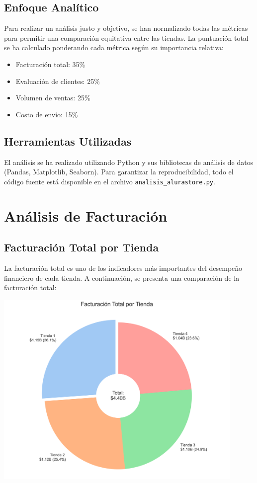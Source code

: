 \documentclass[12pt,a4paper]{report}\usepackage[spanish]{babel}\usepackage[utf8]{inputenc}\usepackage{graphicx}\usepackage{geometry}\usepackage{xcolor}\usepackage{tikz}\usepackage{pgfplots}\usepackage{booktabs}\usepackage{multicol}\usepackage{hyperref}\usepackage{pgf-pie}
\begin{document}
\section{Enfoque Analítico}
Para realizar un análisis justo y objetivo, se han normalizado todas las métricas para permitir una comparación equitativa entre las tiendas. La puntuación total se ha calculado ponderando cada métrica según su importancia relativa:

\begin{itemize}
    \item Facturación total: 35\%
    \item Evaluación de clientes: 25\%
    \item Volumen de ventas: 25\%
    \item Costo de envío: 15\%
\end{itemize}

\section{Herramientas Utilizadas}
El análisis se ha realizado utilizando Python y sus bibliotecas de análisis de datos (Pandas, Matplotlib, Seaborn). Para garantizar la reproducibilidad, todo el código fuente está disponible en el archivo \texttt{analisis\_alurastore.py}.

\chapter{Análisis de Facturación}

\section{Facturación Total por Tienda}

La facturación total es uno de los indicadores más importantes del desempeño financiero de cada tienda. A continuación, se presenta una comparación de la facturación total:

\begin{center}
\includegraphics[width=0.9\textwidth]{1_facturacion_total.png}
\end{center}
\end{document}
